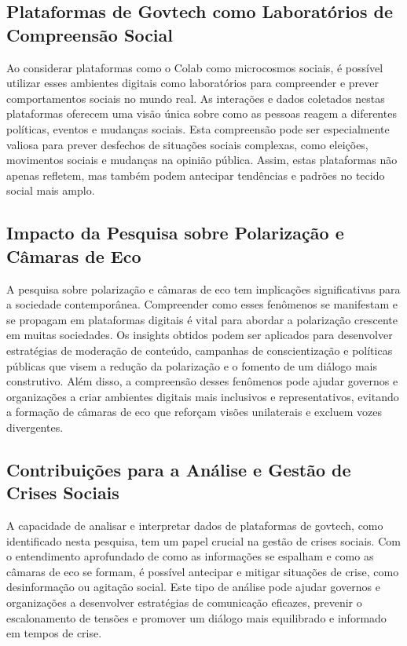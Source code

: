 \subsection*{Plataformas de Govtech como Laboratórios de Compreensão Social}
Ao considerar plataformas como o Colab como microcosmos sociais, é possível utilizar esses ambientes digitais como laboratórios para compreender e prever comportamentos sociais no mundo real. As interações e dados coletados nestas plataformas oferecem uma visão única sobre como as pessoas reagem a diferentes políticas, eventos e mudanças sociais. Esta compreensão pode ser especialmente valiosa para prever desfechos de situações sociais complexas, como eleições, movimentos sociais e mudanças na opinião pública. Assim, estas plataformas não apenas refletem, mas também podem antecipar tendências e padrões no tecido social mais amplo.

\subsection*{Impacto da Pesquisa sobre Polarização e Câmaras de Eco}
A pesquisa sobre polarização e câmaras de eco tem implicações significativas para a sociedade contemporânea. Compreender como esses fenômenos se manifestam e se propagam em plataformas digitais é vital para abordar a polarização crescente em muitas sociedades. Os insights obtidos podem ser aplicados para desenvolver estratégias de moderação de conteúdo, campanhas de conscientização e políticas públicas que visem a redução da polarização e o fomento de um diálogo mais construtivo. Além disso, a compreensão desses fenômenos pode ajudar governos e organizações a criar ambientes digitais mais inclusivos e representativos, evitando a formação de câmaras de eco que reforçam visões unilaterais e excluem vozes divergentes.

\subsection*{Contribuições para a Análise e Gestão de Crises Sociais}
A capacidade de analisar e interpretar dados de plataformas de govtech, como identificado nesta pesquisa, tem um papel crucial na gestão de crises sociais. Com o entendimento aprofundado de como as informações se espalham e como as câmaras de eco se formam, é possível antecipar e mitigar situações de crise, como desinformação ou agitação social. Este tipo de análise pode ajudar governos e organizações a desenvolver estratégias de comunicação eficazes, prevenir o escalonamento de tensões e promover um diálogo mais equilibrado e informado em tempos de crise.

